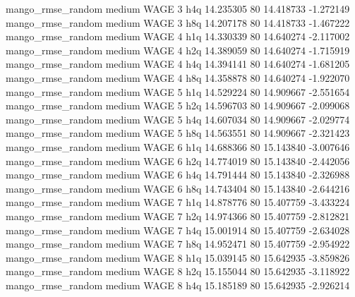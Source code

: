 mango_rmse_random     medium     WAGE                 3                  h4q 14.235305 80      14.418733          -1.272149
mango_rmse_random     medium     WAGE                 3                  h8q 14.207178 80      14.418733          -1.467222
mango_rmse_random     medium     WAGE                 4                  h1q 14.330339 80      14.640274          -2.117002
mango_rmse_random     medium     WAGE                 4                  h2q 14.389059 80      14.640274          -1.715919
mango_rmse_random     medium     WAGE                 4                  h4q 14.394141 80      14.640274          -1.681205
mango_rmse_random     medium     WAGE                 4                  h8q 14.358878 80      14.640274          -1.922070
mango_rmse_random     medium     WAGE                 5                  h1q 14.529224 80      14.909667          -2.551654
mango_rmse_random     medium     WAGE                 5                  h2q 14.596703 80      14.909667          -2.099068
mango_rmse_random     medium     WAGE                 5                  h4q 14.607034 80      14.909667          -2.029774
mango_rmse_random     medium     WAGE                 5                  h8q 14.563551 80      14.909667          -2.321423
mango_rmse_random     medium     WAGE                 6                  h1q 14.688366 80      15.143840          -3.007646
mango_rmse_random     medium     WAGE                 6                  h2q 14.774019 80      15.143840          -2.442056
mango_rmse_random     medium     WAGE                 6                  h4q 14.791444 80      15.143840          -2.326988
mango_rmse_random     medium     WAGE                 6                  h8q 14.743404 80      15.143840          -2.644216
mango_rmse_random     medium     WAGE                 7                  h1q 14.878776 80      15.407759          -3.433224
mango_rmse_random     medium     WAGE                 7                  h2q 14.974366 80      15.407759          -2.812821
mango_rmse_random     medium     WAGE                 7                  h4q 15.001914 80      15.407759          -2.634028
mango_rmse_random     medium     WAGE                 7                  h8q 14.952471 80      15.407759          -2.954922
mango_rmse_random     medium     WAGE                 8                  h1q 15.039145 80      15.642935          -3.859826
mango_rmse_random     medium     WAGE                 8                  h2q 15.155044 80      15.642935          -3.118922
mango_rmse_random     medium     WAGE                 8                  h4q 15.185189 80      15.642935          -2.926214
